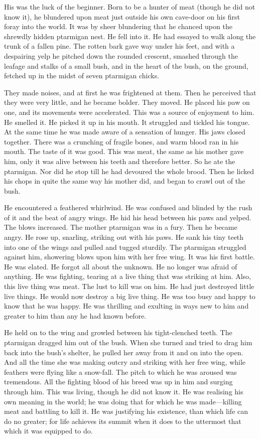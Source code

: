 \documentclass[10pt]{book}
\begin{document}
His was the luck of the beginner. Born to be a hunter of meat (though
he did not know it), he blundered upon meat just outside his own
cave-door on his first foray into the world. It was by sheer blundering
that he chanced upon the shrewdly hidden ptarmigan nest. He fell into
it. He had essayed to walk along the trunk of a fallen pine. The rotten
bark gave way under his feet, and with a despairing yelp he pitched
down the rounded crescent, smashed through the leafage and stalks of a
small bush, and in the heart of the bush, on the ground, fetched up in
the midst of seven ptarmigan chicks.

They made noises, and at first he was frightened at them. Then he
perceived that they were very little, and he became bolder. They moved.
He placed his paw on one, and its movements were accelerated. This was
a source of enjoyment to him. He smelled it. He picked it up in his
mouth. It struggled and tickled his tongue. At the same time he was
made aware of a sensation of hunger. His jaws closed together. There
was a crunching of fragile bones, and warm blood ran in his mouth. The
taste of it was good. This was meat, the same as his mother gave him,
only it was alive between his teeth and therefore better. So he ate the
ptarmigan. Nor did he stop till he had devoured the whole brood. Then
he licked his chops in quite the same way his mother did, and began to
crawl out of the bush.

He encountered a feathered whirlwind. He was confused and blinded by
the rush of it and the beat of angry wings. He hid his head between his
paws and yelped. The blows increased. The mother ptarmigan was in a
fury. Then he became angry. He rose up, snarling, striking out with his
paws. He sank his tiny teeth into one of the wings and pulled and
tugged sturdily. The ptarmigan struggled against him, showering blows
upon him with her free wing. It was his first battle. He was elated. He
forgot all about the unknown. He no longer was afraid of anything. He
was fighting, tearing at a live thing that was striking at him. Also,
this live thing was meat. The lust to kill was on him. He had just
destroyed little live things. He would now destroy a big live thing. He
was too busy and happy to know that he was happy. He was thrilling and
exulting in ways new to him and greater to him than any he had known
before.

He held on to the wing and growled between his tight-clenched teeth.
The ptarmigan dragged him out of the bush. When she turned and tried to
drag him back into the bush’s shelter, he pulled her away from it and
on into the open. And all the time she was making outcry and striking
with her free wing, while feathers were flying like a snow-fall. The
pitch to which he was aroused was tremendous. All the fighting blood of
his breed was up in him and surging through him. This was living,
though he did not know it. He was realising his own meaning in the
world; he was doing that for which he was made—killing meat and
battling to kill it. He was justifying his existence, than which life
can do no greater; for life achieves its summit when it does to the
uttermost that which it was equipped to do.
\end{document}
